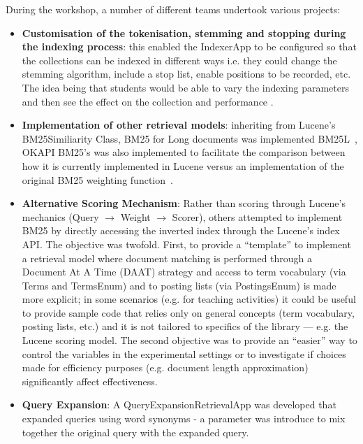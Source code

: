 During the workshop, a number of different teams undertook various projects:
\begin{itemize}
	\item {\bf Customisation of the tokenisation, stemming and stopping during the indexing process}: this enabled the IndexerApp to be configured so that the collections can be indexed in different ways i.e. they could change the stemming algorithm, include a stop list, enable positions to be recorded, etc. The idea being that students would be able to vary the indexing parameters and then see the effect on the collection and performance .
	\item {\bf Implementation of other retrieval models}: inheriting from Lucene's BM25Similiarity Class, BM25 for Long documents was implemented BM25L~\cite{Lv:2011:DVL:2009916.2010070}, OKAPI BM25's was also implemented to facilitate the comparison between how it is currently implemented in Lucene versus an implementation of the original BM25 weighting function~\cite{rup:TFXIDFRepository}.
	\item {\bf Alternative Scoring Mechanism}: Rather than scoring through Lucene's mechanics (Query $\rightarrow$ Weight $\rightarrow$ Scorer), others attempted to implement BM25 by directly accessing the inverted index through the Lucene's index API. The objective was twofold. First, to provide a ``template'' to implement a retrieval model where document matching is performed through a Document At A Time (DAAT) strategy and access to term vocabulary (via Terms and TermsEnum) and to posting lists (via PostingsEnum) is made more explicit; in some scenarios (e.g. for teaching activities) it could be useful to provide sample code that relies only on general concepts (term vocabulary, posting lists, etc.) and it is not tailored to specifics of the library --- e.g. the Lucene scoring model. The second objective was to provide an ``easier'' way to control the variables in the experimental settings or to investigate if choices made for efficiency purposes (e.g. document length approximation) significantly affect effectiveness.
	\item {\bf Query Expansion}: A QueryExpansionRetrievalApp was developed that expanded queries using word synonyms - a parameter was introduce to mix together the original query with the expanded query.

\end{itemize}
